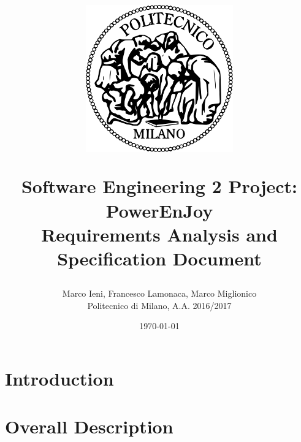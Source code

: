 \documentclass[a4paper, 12pt]{report}
\title{
	\begin{figure}[h]
		\centering
		\includegraphics{../common_resources/logo_polimi.png}
	\end{figure}
	\vspace{30px}
	Software Engineering 2 Project: PowerEnJoy \\ \vspace{1em}
	\textbf{R}equirements \textbf{A}nalysis and \textbf{S}pecification \textbf{D}ocument
}
\author{Marco Ieni, Francesco Lamonaca, Marco Miglionico\\Politecnico di Milano, A.A. 2016/2017}
\date{\today}
\begin{document}
\maketitle
\tableofcontents

\chapter{Introduction}
\label{ch:introduction}







\chapter{Overall Description}
\label{ch:overall_description}

\end{document}
